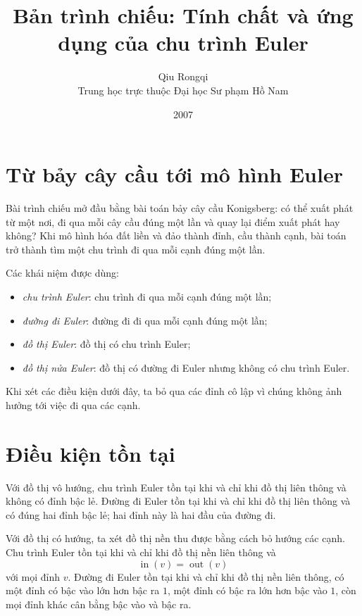 \documentclass[11pt]{article}
\title{Bản trình chiếu: Tính chất và ứng dụng của chu trình Euler}
\author{Qiu Rongqi\\Trung học trực thuộc Đại học Sư phạm Hồ Nam}
\date{2007}
\newcommand{\indeg}{\operatorname{in}}
\newcommand{\outdeg}{\operatorname{out}}
\begin{document}
\maketitle


\section{Từ bảy cây cầu tới mô hình Euler}

Bài trình chiếu mở đầu bằng bài toán bảy cây cầu Konigsberg: có thể xuất phát
từ một nơi, đi qua mỗi cây cầu đúng một lần và quay lại điểm xuất phát hay
không? Khi mô hình hóa đất liền và đảo thành đỉnh, cầu thành cạnh, bài toán
trở thành tìm một chu trình đi qua mỗi cạnh đúng một lần.

Các khái niệm được dùng:
\begin{itemize}
  \item \emph{chu trình Euler}: chu trình đi qua mỗi cạnh đúng một lần;
  \item \emph{đường đi Euler}: đường đi đi qua mỗi cạnh đúng một lần;
  \item \emph{đồ thị Euler}: đồ thị có chu trình Euler;
  \item \emph{đồ thị nửa Euler}: đồ thị có đường đi Euler nhưng không có chu
  trình Euler.
\end{itemize}
Khi xét các điều kiện dưới đây, ta bỏ qua các đỉnh cô lập vì chúng không ảnh
hưởng tới việc đi qua các cạnh.

\section{Điều kiện tồn tại}

Với đồ thị vô hướng, chu trình Euler tồn tại khi và chỉ khi đồ thị liên thông
và không có đỉnh bậc lẻ. Đường đi Euler tồn tại khi và chỉ khi đồ thị liên
thông và có đúng hai đỉnh bậc lẻ; hai đỉnh này là hai đầu của đường đi.

Với đồ thị có hướng, ta xét đồ thị nền thu được bằng cách bỏ hướng các cạnh.
Chu trình Euler tồn tại khi và chỉ khi đồ thị nền liên thông và
\[
  \indeg(v)=\outdeg(v)
\]
với mọi đỉnh \(v\). Đường đi Euler tồn tại khi và chỉ khi đồ thị nền liên
thông, có một đỉnh có bậc vào lớn hơn bậc ra \(1\), một đỉnh có bậc ra lớn hơn
bậc vào \(1\), còn mọi đỉnh khác cân bằng bậc vào và bậc ra.
\end{document}
